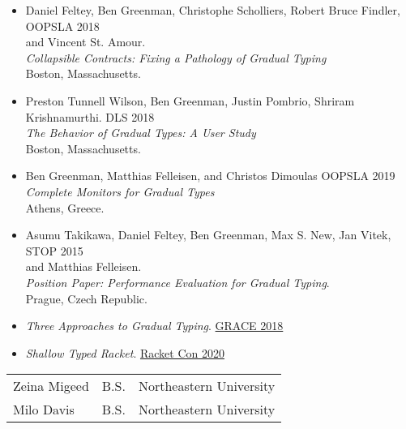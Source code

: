 \documentclass{article}
\begin{document}
\begin{itemize}
\item
  Daniel Feltey, Ben Greenman, Christophe Scholliers, Robert Bruce Findler, \hfill OOPSLA 2018 \\
  and Vincent St. Amour. \\
  \emph{Collapsible Contracts: Fixing a Pathology of Gradual Typing} \\
  Boston, Massachusetts.
\item
  Preston Tunnell Wilson, Ben Greenman, Justin Pombrio, Shriram Krishnamurthi. \hfill DLS 2018 \\
  \emph{The Behavior of Gradual Types: A User Study} \\
  Boston, Massachusetts.
\item
  Ben Greenman, Matthias Felleisen, and Christos Dimoulas \hfill OOPSLA 2019 \\
  \emph{Complete Monitors for Gradual Types} \\
  Athens, Greece.
\end{itemize}

\begin{itemize}
\item
  Asumu Takikawa, Daniel Feltey, Ben Greenman, Max S. New, Jan Vitek, \hfill STOP 2015 \\
   and Matthias Felleisen. \\
   \emph{Position Paper: Performance Evaluation for Gradual Typing}. \\
  Prague, Czech Republic.
\end{itemize}

\newpage
{}
\begin{itemize}
  \item \emph{Three Approaches to Gradual Typing}. \hfill \href{https://2018.splashcon.org/track/grace-2018-papers}{GRACE 2018}
  \item \emph{Shallow Typed Racket}. \hfill \href{https://con.racket-lang.org/2020}{Racket Con 2020}
\end{itemize}



\begin{tabular}{l l l}
  Zeina Migeed & B.S. & Northeastern University
  \\[1ex]
  Milo Davis   & B.S. & Northeastern University
\end{tabular}


\end{document}
